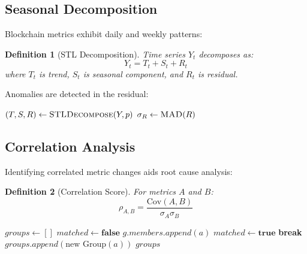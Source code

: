 \documentclass[11pt,a4paper]{article}
\newtheorem{definition}{Definition}
\begin{document}
\subsection{Seasonal Decomposition}

Blockchain metrics exhibit daily and weekly patterns:

\begin{definition}[STL Decomposition]
Time series $Y_t$ decomposes as:
\[
Y_t = T_t + S_t + R_t
\]
where $T_t$ is trend, $S_t$ is seasonal component, and $R_t$ is residual.
\end{definition}

Anomalies are detected in the residual:

\begin{algorithm}
\caption{Seasonal Anomaly Detection}
\begin{algorithmic}[1]
    \State $(T, S, R) \gets \Call{STLDecompose}{Y, p}$
    \State $\sigma_R \gets \Call{MAD}{R}$ 
            \State {}
        \EndIf
    \EndFor
\EndProcedure
\end{algorithmic}
\end{algorithm}

\subsection{Correlation Analysis}

Identifying correlated metric changes aids root cause analysis:

\begin{definition}[Correlation Score]
For metrics $A$ and $B$:
\[
\rho_{A,B} = \frac{\text{Cov}(A, B)}{\sigma_A \sigma_B}
\]
\end{definition}

\begin{algorithm}
\caption{Correlated Anomaly Grouping}
\begin{algorithmic}[1]
    \State $groups \gets []$
        \State $matched \gets \textbf{false}$
                \State $g.members.append(a)$
                \State $matched \gets \textbf{true}$
                \State \textbf{break}
            \EndIf
        \EndFor
            \State $groups.append(\text{new Group}(a))$
        \EndIf
    \EndFor
    \State \Return $groups$
\EndProcedure
\end{algorithmic}
\end{algorithm}
\end{document}

